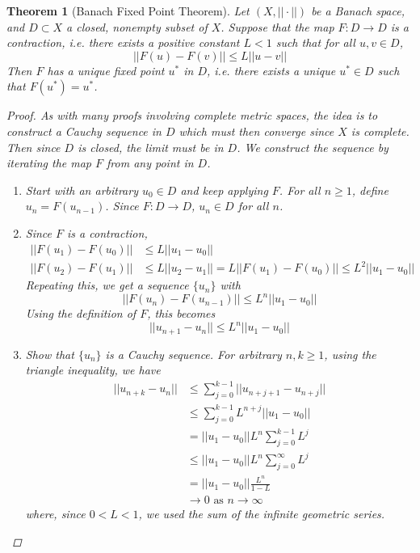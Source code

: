 \documentclass[10pt]{article}         %
\newtheorem{theorem}{Theorem}[section]
\theoremstyle{remark}
\begin{document}
\begin{theorem}[Banach Fixed Point Theorem] Let $(X, ||\cdot||)$ be a Banach space, and $D \subset X$ a closed, nonempty subset of $X$. Suppose that the map $F: D \rightarrow D$ is a contraction, i.e. there exists a positive constant $L < 1$ such that for all $u, v \in D$,
\[
||F(u) - F(v)|| \leq L||u - v||
\]
Then $F$ has a unique fixed point $u^*$ in $D$, i.e. there exists a unique $u^* \in D$ such that $F(u^*) = u^*$.

\begin{proof}
As with many proofs involving complete metric spaces, the idea is to construct a Cauchy sequence in $D$ which must then converge since $X$ is complete. Then since $D$ is closed, the limit must be in $D$. We construct the sequence by iterating the map $F$ from any point in $D$.

\begin{enumerate}
	\item Start with an arbitrary $u_0 \in D$ and keep applying $F$. For all $n \geq 1$, define $u_n = F(u_{n-1})$. Since $F: D \rightarrow D$, $u_n \in D$ for all $n$.
	
	\item Since $F$ is a contraction,
	\begin{align*}
	||F(u_1) - F(u_0)|| &\leq L ||u_1 - u_0|| \\
	||F(u_2) - F(u_1)|| &\leq L ||u_2 - u_1|| = L||F(u_1) - F(u_0)|| \leq L^2 ||u_1 - u_0||
	\end{align*}
	Repeating this, we get a sequence $\{u_n\}$ with
	\[
	||F(u_n) - F(u_{n-1})|| \leq L^n ||u_1 - u_0||
	\]
	Using the definition of $F$, this becomes
	\[
	||u_{n+1} - u_n || \leq L^n ||u_1 - u_0||
	\]
	
	\item Show that $\{ u_n \}$ is a Cauchy sequence. For arbitrary $n, k \geq 1$, using the triangle inequality, we have
	\begin{align*}
	||u_{n+k} - u_n|| &\leq \sum_{j=0}^{k-1} || u_{n+j+1} - u_{n+j}|| \\
	&\leq \sum_{j=0}^{k-1} L^{n+j} ||u_1 - u_0|| \\
	&= ||u_1 - u_0|| L^n \sum_{j=0}^{k-1} L^j \\
	&\leq ||u_1 - u_0|| L^n \sum_{j=0}^{\infty} L^j \\
	&= ||u_1 - u_0|| \frac{L^n}{1 - L} \\
	&\rightarrow 0 \text{ as }n \rightarrow \infty
	\end{align*}
	where, since $0 < L < 1$, we used the sum of the infinite geometric series.
	

\end{enumerate}
\end{proof}
\end{theorem}
\end{document}
